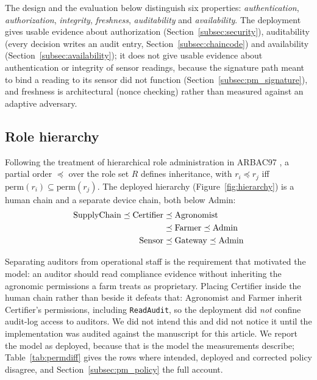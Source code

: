 \documentclass[a4paper,fleqn]{cas-dc}
\begin{document}
The design and the evaluation below distinguish six properties:
\emph{authentication}, \emph{authorization}, \emph{integrity},
\emph{freshness}, \emph{auditability} and \emph{availability}. The
deployment gives usable evidence about authorization
(Section~\ref{subsec:security}), auditability (every decision writes an
audit entry, Section~\ref{subsec:chaincode}) and availability
(Section~\ref{subsec:availability}); it does not give usable evidence about
authentication or integrity of sensor readings, because the signature path
meant to bind a reading to its sensor did not function
(Section~\ref{subsec:pm_signature}), and freshness is architectural (nonce
checking) rather than measured against an adaptive adversary.

\subsection{Role hierarchy}
\label{subsec:roles}

Following the treatment of hierarchical role administration in ARBAC97
\cite{sandhu1999arbac97}, a partial order $\preceq$ over the role set $R$
defines inheritance, with $r_i \preceq r_j$ iff
$\mathrm{perm}(r_i) \subseteq \mathrm{perm}(r_j)$. The deployed hierarchy
(Figure~\ref{fig:hierarchy}) is a human chain and a separate device chain,
both below Admin:
\begin{align}
\mathrm{SupplyChain} \preceq \mathrm{Certifier}
  &\preceq \mathrm{Agronomist} \notag\\
  &\preceq \mathrm{Farmer} \preceq \mathrm{Admin}
  \label{eq:human}\\
\mathrm{Sensor} &\preceq \mathrm{Gateway} \preceq \mathrm{Admin}
  \label{eq:device}
\end{align}

Separating auditors from operational staff is the requirement that motivated
the model: an auditor should read compliance evidence without inheriting the
agronomic permissions a farm treats as proprietary. Placing Certifier inside
the human chain rather than beside it defeats that: Agronomist and Farmer
inherit Certifier's permissions, including \texttt{ReadAudit}, so the
deployment did \emph{not} confine audit-log access to auditors. We did not
intend this and did not notice it until the implementation was audited
against the manuscript for this article. We report the model as deployed,
because that is the model the measurements describe; Table~\ref{tab:permdiff}
gives the rows where intended, deployed and corrected policy disagree, and
Section~\ref{subsec:pm_policy} the full account.
\end{document}
